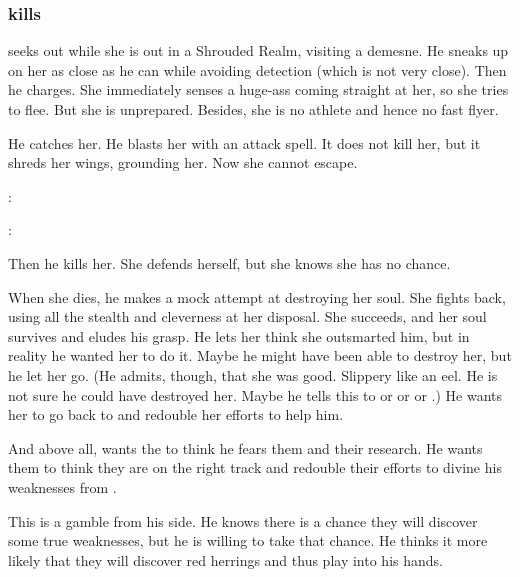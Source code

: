 \subsubsection{\Ishnaruchaefir kills \Urizeth}
\Ishnaruchaefir{} seeks out \Urizeth{} while she is out in a Shrouded Realm, visiting a demesne. 
He sneaks up on her as close as he can while avoiding detection (which is not very close). 
Then he charges. 
She immediately senses a huge-ass \vertex{} coming straight at her, so she tries to flee. 
But she is unprepared. 
Besides, she is no athlete and hence no fast flyer. 

He catches her. 
He blasts her with an attack spell. 
It does not kill her, but it shreds her wings, grounding her. 
Now she cannot escape. 

\begin{prose}
  \Urizeth: 

  \Ishnaruchaefir: 
\end{prose}

Then he kills her. 
She defends herself, but she knows she has no chance. 

When she dies, he makes a mock attempt at destroying her soul. 
She fights back, using all the \TiphredSerah{} stealth and cleverness at her disposal. 
She succeeds, and her soul survives and eludes his grasp.
He lets her think she outsmarted him, but in reality he wanted her to do it. 
Maybe he might have been able to destroy her, but he let her go. 
(He admits, though, that she was good. Slippery like an eel. He is not sure he could have destroyed her. Maybe he tells this to \Secherdamon{} or \Nzessuacrith{} or \Menessiaraid{} or \Criseis.) 
He wants her to go back to \Teshrial{} and redouble her efforts to help him. 

And above all, \Ishnaruchaefir{} wants the \resphain{} to think he fears them and their research. 
He wants them to think they are on the right track and redouble their efforts to divine his weaknesses from \WanderersInDarknessEmph. 

This is a gamble from his side. 
He knows there is a chance they will discover some true weaknesses, but he is willing to take that chance. 
He thinks it more likely that they will discover red herrings and thus play into his hands. 





